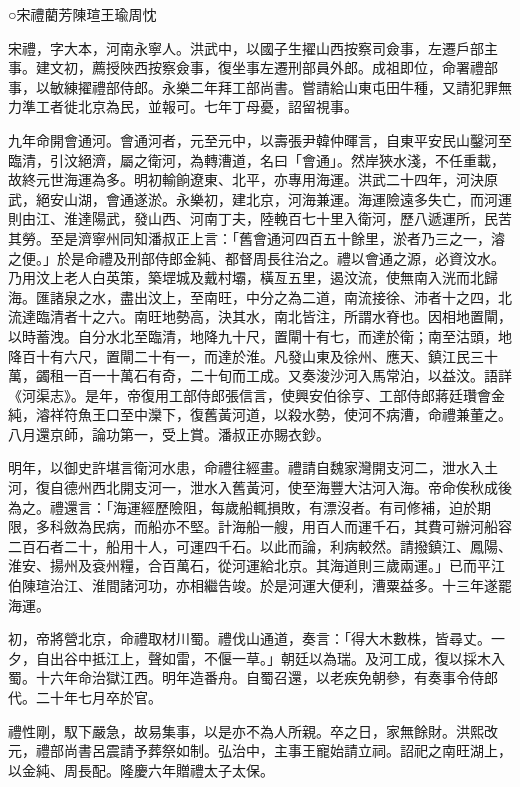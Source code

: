 
\begin{pinyinscope}
○宋禮藺芳陳瑄王瑜周忱

宋禮，字大本，河南永寧人。洪武中，以國子生擢山西按察司僉事，左遷戶部主事。建文初，薦授陜西按察僉事，復坐事左遷刑部員外郎。成祖即位，命署禮部事，以敏練擢禮部侍郎。永樂二年拜工部尚書。嘗請給山東屯田牛種，又請犯罪無力準工者徙北京為民，並報可。七年丁母憂，詔留視事。

九年命開會通河。會通河者，元至元中，以壽張尹韓仲暉言，自東平安民山鑿河至臨清，引汶絕濟，屬之衛河，為轉漕道，名曰「會通」。然岸狹水淺，不任重載，故終元世海運為多。明初輸餉遼東、北平，亦專用海運。洪武二十四年，河決原武，絕安山湖，會通遂淤。永樂初，建北京，河海兼運。海運險遠多失亡，而河運則由江、淮達陽武，發山西、河南丁夫，陸輓百七十里入衛河，歷八遞運所，民苦其勞。至是濟寧州同知潘叔正上言：「舊會通河四百五十餘里，淤者乃三之一，濬之便。」於是命禮及刑部侍郎金純、都督周長往治之。禮以會通之源，必資汶水。乃用汶上老人白英策，築堽城及戴村壩，橫亙五里，遏汶流，使無南入洸而北歸海。匯諸泉之水，盡出汶上，至南旺，中分之為二道，南流接徐、沛者十之四，北流達臨清者十之六。南旺地勢高，決其水，南北皆注，所謂水脊也。因相地置閘，以時蓄洩。自分水北至臨清，地降九十尺，置閘十有七，而達於衛；南至沽頭，地降百十有六尺，置閘二十有一，而達於淮。凡發山東及徐州、應天、鎮江民三十萬，蠲租一百一十萬石有奇，二十旬而工成。又奏浚沙河入馬常泊，以益汶。語詳《河渠志》。是年，帝復用工部侍郎張信言，使興安伯徐亨、工部侍郎蔣廷瓚會金純，濬祥符魚王口至中灤下，復舊黃河道，以殺水勢，使河不病漕，命禮兼董之。八月還京師，論功第一，受上賞。潘叔正亦賜衣鈔。

明年，以御史許堪言衛河水患，命禮往經畫。禮請自魏家灣開支河二，泄水入土河，復自德州西北開支河一，泄水入舊黃河，使至海豐大沽河入海。帝命俟秋成後為之。禮還言：「海運經歷險阻，每歲船輒損敗，有漂沒者。有司修補，迫於期限，多科斂為民病，而船亦不堅。計海船一艘，用百人而運千石，其費可辦河船容二百石者二十，船用十人，可運四千石。以此而論，利病較然。請撥鎮江、鳳陽、淮安、揚州及袞州糧，合百萬石，從河運給北京。其海道則三歲兩運。」已而平江伯陳瑄治江、淮間諸河功，亦相繼告竣。於是河運大便利，漕粟益多。十三年遂罷海運。

初，帝將營北京，命禮取材川蜀。禮伐山通道，奏言：「得大木數株，皆尋丈。一夕，自出谷中抵江上，聲如雷，不偃一草。」朝廷以為瑞。及河工成，復以採木入蜀。十六年命治獄江西。明年造番舟。自蜀召還，以老疾免朝參，有奏事令侍郎代。二十年七月卒於官。

禮性剛，馭下嚴急，故易集事，以是亦不為人所親。卒之日，家無餘財。洪熙改元，禮部尚書呂震請予葬祭如制。弘治中，主事王寵始請立祠。詔祀之南旺湖上，以金純、周長配。隆慶六年贈禮太子太保。


\end{pinyinscope}
